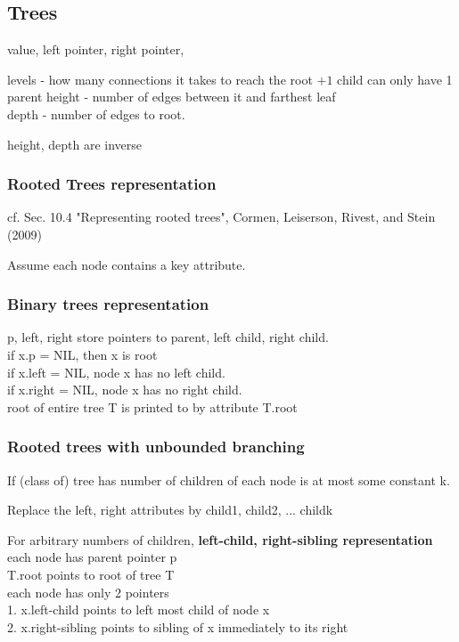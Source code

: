 \documentclass[10pt]{amsart}
\begin{document}
\begin{multicols*}{2}
\subsection{Trees}

value, left pointer, right pointer,

levels - how many connections it takes to reach the root $+ 1$
child can only have 1 parent
height - number of edges between it and farthest leaf \\
depth - number of edges to root.

height, depth are inverse

\subsubsection{Rooted Trees representation}

cf. Sec. 10.4 "Representing rooted trees", Cormen, Leiserson, Rivest, and Stein (2009) \cite{CLRS2009}

Assume each node contains a key attribute.

\subsubsection{Binary trees representation}

p, left, right store pointers to parent, left child, right child. \\
if x.p = NIL, then x is root \\
if x.left = NIL, node x has no left child. \\
if x.right = NIL, node x has no right child. \\

root of entire tree T is printed to by attribute T.root 

\subsubsection{Rooted trees with unbounded branching}

If (class of) tree has number of children of each node is at most some constant k.

Replace the left, right attributes by child1, child2, ... childk

For arbitrary numbers of children, \textbf{left-child, right-sibling representation} \\
each node has parent pointer p \\
T.root points to root of tree T \\
each node has only 2 pointers \\
1. x.left-child points to left most child of node x \\
2. x.right-sibling points to sibling of x immediately to its right \\


\end{multicols*}
\end{document}

